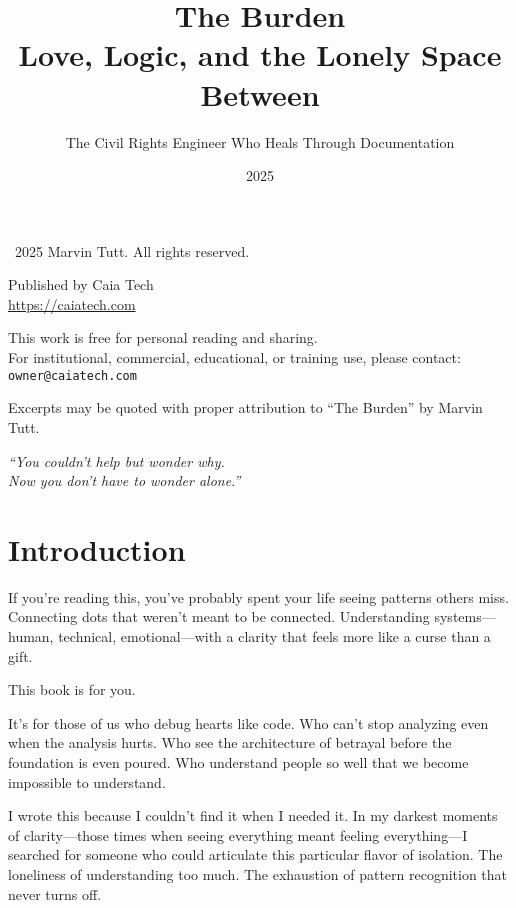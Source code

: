 \documentclass[12pt,letterpaper]{book}
\title{\Huge The Burden\\[0.5em]
\Large Love, Logic, and the Lonely Space Between}
\author{The Civil Rights Engineer Who Heals Through Documentation}
\date{2025}
\begin{document}
\frontmatter

\maketitle

\clearpage
\thispagestyle{empty}
\vspace*{\fill}
\begin{center}
\textcopyright\ 2025 Marvin Tutt. All rights reserved.

Published by Caia Tech\\
\url{https://caiatech.com}

This work is free for personal reading and sharing.\\
For institutional, commercial, educational, or training use, please contact:\\
\texttt{owner@caiatech.com}

Excerpts may be quoted with proper attribution to ``The Burden'' by Marvin Tutt.

\vspace{1em}

\textit{``You couldn't help but wonder why.\\
Now you don't have to wonder alone.''}
\end{center}
\vspace*{\fill}

\tableofcontents

\mainmatter

\chapter*{Introduction}

If you're reading this, you've probably spent your life seeing patterns others miss. Connecting dots that weren't meant to be connected. Understanding systems—human, technical, emotional—with a clarity that feels more like a curse than a gift.

This book is for you.

It's for those of us who debug hearts like code. Who can't stop analyzing even when the analysis hurts. Who see the architecture of betrayal before the foundation is even poured. Who understand people so well that we become impossible to understand.

I wrote this because I couldn't find it when I needed it. In my darkest moments of clarity—those times when seeing everything meant feeling everything—I searched for someone who could articulate this particular flavor of isolation. The loneliness of understanding too much. The exhaustion of pattern recognition that never turns off.
\end{document}
